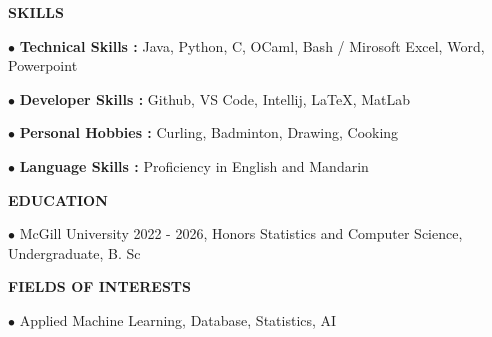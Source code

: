 \documentclass[12pt]{article}
\begin{document}
\vspace*{0.3cm}
\textbf{SKILLS}

\vspace*{0.3cm}
$\bullet$ \textbf{Technical Skills : } Java, Python, C, OCaml, Bash / Mirosoft Excel, Word, Powerpoint

$\bullet$ \textbf{Developer Skills : } Github, VS Code, Intellij, \LaTeX, MatLab

$\bullet$ \textbf{Personal Hobbies : } Curling, Badminton, Drawing, Cooking

$\bullet$ \textbf{Language Skills : } Proficiency in English and Mandarin


\vspace*{0.3cm}
\textbf{EDUCATION}

\vspace*{0.3cm}
$\bullet$ McGill University 2022 - 2026, 
Honors Statistics and Computer Science, Undergraduate, B. Sc

\vspace*{0.3cm}
\textbf{FIELDS OF INTERESTS}

\vspace*{0.3cm}
$\bullet$ Applied Machine Learning, Database, Statistics, 
AI
\end{document}
